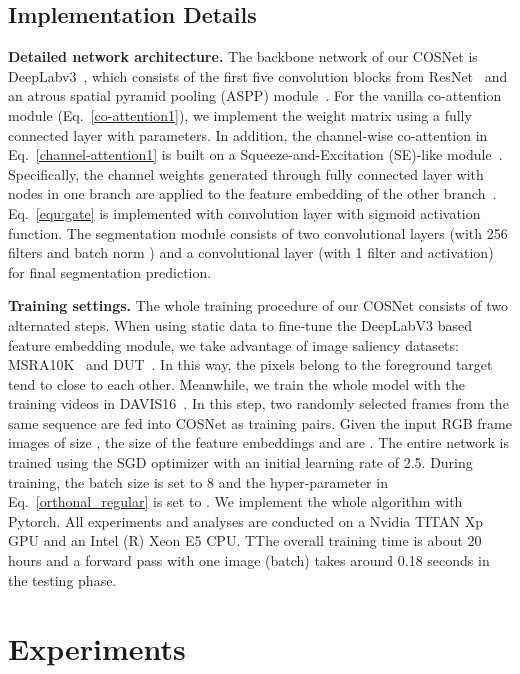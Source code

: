 \documentclass[10pt,twocolumn,letterpaper]{article}
\begin{document}
\subsection{Implementation Details}
\noindent\textbf{Detailed network architecture.}\label{sec:dna}
The backbone network of our COSNet is DeepLabv3~\cite{DBLP:journals/corr/ChenPSA17}, which consists of the first five convolution blocks from ResNet~\cite{DBLP:conf/cvpr/HeZRS16} and an atrous spatial pyramid pooling (ASPP) module~\cite{DBLP:journals/corr/ChenPSA17}.  For the vanilla co-attention module (Eq.~\ref{co-attention1}), we implement the weight matrix   using a fully connected layer with  parameters.
In addition, the channel-wise co-attention in Eq.~\ref{channel-attention1} is built on a Squeeze-and-Excitation (SE)-like module~\cite{hu2018senet}. Specifically, the channel weights generated through fully connected layer with   nodes in one branch are applied to the feature embedding of the other branch~\cite{hu2018senet}. Eq.~\ref{equ:gate} is implemented with  convolution layer with sigmoid activation function.
The segmentation module consists of two  convolutional layers (with 256 filters and batch norm ) and a  convolutional layer (with 1 filter and  activation) for final segmentation prediction.

\noindent\textbf{Training settings.}
The whole training procedure of our COSNet consists of two alternated steps. When using static data to fine-tune the DeepLabV3 based feature embedding module, we take advantage of image saliency datasets: MSRA10K~\cite{cheng2015global} and DUT~\cite{DBLP:conf/cvpr/YangZLRY13}. In this way, the pixels
belong to the foreground target tend to close to each
other. Meanwhile, we train the whole model with the training videos in DAVIS16~\cite{perazzi2016benchmark}. In this step, two randomly selected frames from the same sequence are fed into COSNet as training pairs. Given the input RGB frame images of size , the size of the feature embeddings  and  are  .
The entire network is trained using the SGD optimizer with an initial learning rate of 2.5. During training, the batch size is set to 8 and the hyper-parameter   in Eq.~\ref{orthonal_regular} is set to  .  We implement the whole algorithm with Pytorch. All experiments and analyses are conducted on a Nvidia TITAN Xp GPU and an Intel (R) Xeon E5 CPU. TThe overall training time is about 20 hours and a forward pass with one image (batch) takes around 0.18 seconds in the testing phase.
\vspace*{-5pt}
\section{Experiments}\label{experiment}
\end{document}
